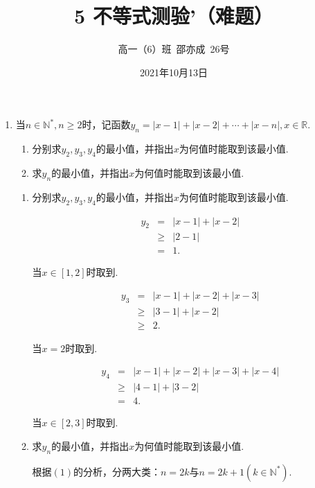 \documentclass[8pt]{article}
\author{高一（6）班\ 邵亦成\ 26号}
\title{5 不等式测验'（难题）}
\date{2021年10月13日}
\begin{document}
	\maketitle

	\begin{enumerate}

		\item
			当$n\in \mathbb{N}^{*}, n\geq2$时，记函数$y_n=|x-1|+|x-2|+\cdots+|x-n|, x\in\mathbb{R}.$

			\begin{enumerate} [$(1)$]
				\item
					分别求$y_2, y_3, y_4$的最小值，并指出$x$为何值时能取到该最小值.

				\item
					求$y_n$的最小值，并指出$x$为何值时能取到该最小值.

			\end{enumerate}

			\begin{enumerate} [$(1)$]
				\item
					分别求$y_2, y_3, y_4$的最小值，并指出$x$为何值时能取到该最小值.

					$$
					\begin{array}{rcl}
						y_2&=&|x-1|+|x-2|\\
						&\geq&|2-1|\\
						&=&1.
					\end{array}
					$$

					当$x\in[1,2]$时取到.

					$$
					\begin{array}{rcl}
						y_3&=&|x-1|+|x-2|+|x-3|\\
						&\geq&|3-1|+|x-2|\\
						&\geq&2.
					\end{array}
					$$

					当$x=2$时取到.

					$$
					\begin{array}{rcl}
						y_4&=&|x-1|+|x-2|+|x-3|+|x-4|\\
						&\geq&|4-1|+|3-2|\\
						&=&4.
					\end{array}
					$$

					当$x\in[2,3]$时取到.

				\item
					求$y_n$的最小值，并指出$x$为何值时能取到该最小值.

					根据$(1)$的分析，分两大类：$n=2k$与$n=2k+1$$(k\in\mathbb{N}^{*})$.


\end{enumerate}
\end{enumerate}
\end{document}
